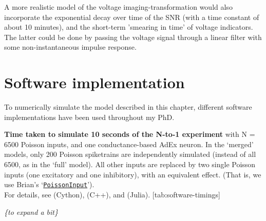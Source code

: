 A more realistic model of the voltage imaging-transformation would also incorporate the exponential decay over time of the SNR (with a time constant of about 10 minutes), and the short-term 'smearing in time' of voltage indicators. The latter could be done by passing the voltage signal through a linear filter with some non-instantaneous impulse response.



\section{Software implementation}
\label{sec:software}

To numerically simulate the model described in this chapter, different software implementations have been used throughout my PhD.

\begin{table}[h]
    \begin{sidecaption}
        {\textbf{Time taken to simulate 10 seconds of the N-to-1 experiment}
        {\small with N = 6500 Poisson inputs, and one conductance-based AdEx neuron. In the `merged' models, only 200 Poisson spiketrains are independently simulated (instead of all 6500, as in the `full' model). All other inputs are replaced by two single Poisson inputs (one excitatory and one inhibitory), with an equivalent effect. (That is, we use Brian's `\texttt{\href{https://brian2.readthedocs.io/en/stable/user/input.html\#efficient-poisson-inputs-via-poissoninput}{PoissonInput}}').\\
        For details, see  (Cython),  (C++), and  (Julia).}
        }
        [tab:software-timings]
    \end{sidecaption}
\end{table}


\emph{\{to expand a bit\}}
